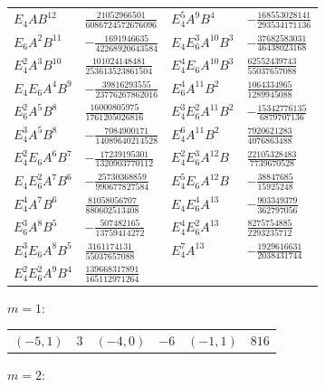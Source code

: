 {\small\begin{tabular}{@{}l@{\ \ }l@{\qquad}l@{\ \ }l@{}}
$E_4 A B^{12}$ & $\tfrac{21052966501}{6086724572676096}$ & $E_4^{5} A^{9} B^{4}$ & $-\tfrac{168553028141}{293534171136}$ \\
$E_6 A^{2} B^{11}$ & $-\tfrac{1691946635}{42268920643584}$ & $E_4 E_6^{3} A^{10} B^{3}$ & $-\tfrac{37682583031}{46438023168}$ \\
$E_4^{2} A^{3} B^{10}$ & $\tfrac{101024148481}{253613523861504}$ & $E_4^{4} E_6 A^{10} B^{3}$ & $\tfrac{62552439743}{55037657088}$ \\
$E_4 E_6 A^{4} B^{9}$ & $-\tfrac{39816293555}{23776267862016}$ & $E_6^{4} A^{11} B^{2}$ & $\tfrac{1064334965}{1289945088}$ \\
$E_6^{2} A^{5} B^{8}$ & $\tfrac{16000805975}{1761205026816}$ & $E_4^{3} E_6^{2} A^{11} B^{2}$ & $-\tfrac{15342776135}{6879707136}$ \\
$E_4^{3} A^{5} B^{8}$ & $-\tfrac{7084900171}{14089640214528}$ & $E_4^{6} A^{11} B^{2}$ & $\tfrac{7920621283}{4076863488}$ \\
$E_4^{2} E_6 A^{6} B^{7}$ & $-\tfrac{17239195301}{1320903770112}$ & $E_4^{2} E_6^{3} A^{12} B$ & $\tfrac{22105328483}{7739670528}$ \\
$E_4 E_6^{2} A^{7} B^{6}$ & $-\tfrac{25730368859}{990677827584}$ & $E_4^{5} E_6 A^{12} B$ & $-\tfrac{38847685}{15925248}$ \\
$E_4^{4} A^{7} B^{6}$ & $\tfrac{81058056707}{880602513408}$ & $E_4 E_6^{4} A^{13}$ & $-\tfrac{903349379}{362797056}$ \\
$E_6^{3} A^{8} B^{5}$ & $-\tfrac{507482165}{13759414272}$ & $E_4^{4} E_6^{2} A^{13}$ & $\tfrac{8275754885}{2293235712}$ \\
$E_4^{3} E_6 A^{8} B^{5}$ & $\tfrac{3161174131}{55037657088}$ & $E_4^{7} A^{13}$ & $-\tfrac{1929616631}{2038431744}$ \\
$E_4^{2} E_6^{2} A^{9} B^{4}$ & $\tfrac{139668317891}{165112971264}$ & & \\
\end{tabular}}\par\medskip
\noindent$m=1$:\nopagebreak\\[2pt]
{\small\begin{tabular}{@{}r@{\ \ }r@{\qquad}r@{\ \ }r@{\qquad}r@{\ \ }r@{}}
$(-5,1)$ & $3$ & $(-4,0)$ & $-6$ & $(-1,1)$ & $816$ \\
\end{tabular}}\par\medskip
\noindent$m=2$:\nopagebreak\\[2pt]
